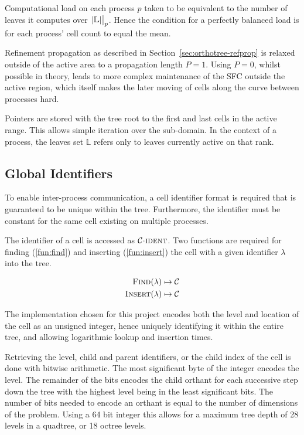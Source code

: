 \documentclass[twoside]{IIBproject}
\newcommand{\acc}{{\mkern 0.5mu\cdot\mkern 0.5mu}}
\numberwithin{figure}{section}
\begin{document}
        Computational load on each process $p$ taken to be equivalent to the number of leaves it computes over $\eval{\abs{\mathbb{L}}}_p$. Hence the condition for a perfectly balanced load is for each process' cell count to equal the mean.

        Refinement propagation as described in Section~\ref{sec:orthotree-refprop} is relaxed outside of the active area to a propagation length $P=1$. Using $P=0$, whilst possible in theory, leads to more complex maintenance of the SFC outside the active region, which itself makes the later moving of cells along the curve between processes hard. 

        Pointers are stored with the tree root to the first and last cells in the active range. This allows simple iteration over the sub-domain. In the context of a process, the leaves set $\mathbb{L}$ refers only to leaves currently active on that rank.



    \subsection{Global Identifiers} %
        \label{sec:globalid}

        To enable inter-process communication, a cell identifier format is required that is guaranteed to be unique within the tree. Furthermore, the identifier must be constant for the same cell existing on multiple processes.

        The identifier of a cell is accessed as $\mathcal{C}\acc\textproc{ident}$. Two functions are required for finding (\ref{fun:find}) and inserting (\ref{fun:insert}) the cell with a given identifier $\lambda$ into the tree.

        \begin{align}
            \label{fun:find}
            \textproc{Find}(\lambda) \mapsto \mathcal{C} \\
            \label{fun:insert}
            \textproc{Insert}(\lambda) \mapsto \mathcal{C}
        \end{align}

        The implementation chosen for this project encodes both the level and location of the cell as an unsigned integer, hence uniquely identifying it within the entire tree, and allowing logarithmic lookup and insertion times.

        Retrieving the level, child and parent identifiers, or the child index of the cell is done with bitwise arithmetic. The most significant byte of the integer encodes the level. The remainder of the bits encodes the child orthant for each successive step down the tree with the highest level being in the least significant bits. The number of bits needed to encode an orthant is equal to the number of dimensions of the problem. Using a 64 bit integer this allows for a maximum tree depth of 28 levels in a quadtree, or 18 octree levels.
\end{document}
